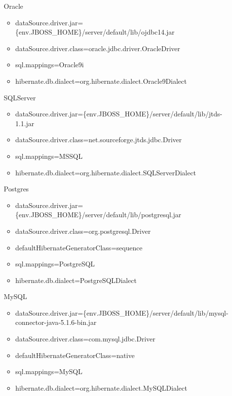 \begin{itemize}
	\item [Oracle] \hfill
	\begin{itemize}
		\item dataSource.driver.jar=\textdollar{}\{env.JBOSS\_HOME\}/server/default/lib/ojdbc14.jar
		\item dataSource.driver.class=oracle.jdbc.driver.OracleDriver
		\item sql.mappings=Oracle9i
		\item hibernate.db.dialect=org.hibernate.dialect.Oracle9Dialect
	\end{itemize}
	\item [SQLServer] \hfill
	\begin{itemize}
		\item dataSource.driver.jar=\textdollar{}\{env.JBOSS\_HOME\}/server/default/lib/jtds-1.1.jar
		\item dataSource.driver.class=net.sourceforge.jtds.jdbc.Driver
		\item sql.mappings=MSSQL
		\item hibernate.db.dialect=org.hibernate.dialect.SQLServerDialect
	\end{itemize} 
	\item [Postgres] \hfill
	\begin{itemize}
		\item dataSource.driver.jar=\textdollar{}\{env.JBOSS\_HOME\}/server/default/lib/postgresql.jar
		\item dataSource.driver.class=org.postgresql.Driver
		\item defaultHibernateGeneratorClass=sequence
		\item sql.mappings=PostgreSQL
		\item hibernate.db.dialect=PostgreSQLDialect
	\end{itemize}
	\item [MySQL] \hfill
	\begin{itemize}
		\item dataSource.driver.jar=\textdollar{}\{env.JBOSS\_HOME\}/server/default/lib/mysql-connector-java-5.1.6-bin.jar
		\item dataSource.driver.class=com.mysql.jdbc.Driver
		\item defaultHibernateGeneratorClass=native
		\item sql.mappings=MySQL
		\item hibernate.db.dialect=org.hibernate.dialect.MySQLDialect
	\end{itemize}
\end{itemize}

